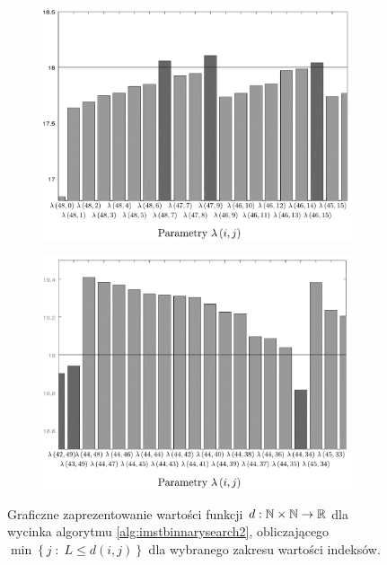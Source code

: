 {\begin{figure}[!htbp]
	\null\hfill
	\begin{subfigure}[b]{0.45\textwidth}
		\includegraphics[width=\textwidth]{Chapter_IV/INC_MST_LAMBDA-chart/min}
		\caption{}
		\label{fig:imstdminmax:a}
	\end{subfigure}
	\hfill
	\begin{subfigure}[b]{0.45\textwidth}
		\includegraphics[width=\textwidth]{Chapter_IV/INC_MST_LAMBDA-chart/max}
		\caption{}
		\label{fig:imstdminmax:b}
	\end{subfigure}
	\hfill\null
	\caption{
		Graficzne zaprezentowanie wartości funkcji $d: \mathbb{N} \times \mathbb{N} \rightarrow \mathbb{R}$ dla wycinka algorytmu \ref{alg:imstbinnarysearch2}, obliczającego $\min \left\{ j \; : \; L \leqslant d \left( i, j \right) \right\}$ dla wybranego zakresu wartości indeksów. 
}
\end{figure}}
